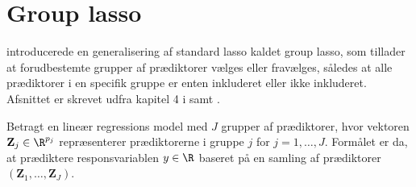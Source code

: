 \section{Group lasso}
\citep{group_lasso} introducerede en generalisering af standard lasso kaldet group lasso, som tillader at forudbestemte grupper af prædiktorer vælges eller fravælges, således at alle prædiktorer i en specifik gruppe er enten inkluderet eller ikke inkluderet.
Afsnittet er skrevet udfra kapitel 4 i \citep{hastie} samt \citep{group_lasso}.

Betragt en lineær regressions model med $J$ grupper af prædiktorer, hvor vektoren $\mathbf{Z}_j \in \R^{p_j}$ repræsenterer prædiktorerne i gruppe $j$ for $j=1, \ldots, J$.
Formålet er da, at prædiktere responsvariablen $y \in \R$ baseret på en samling af prædiktorer $(\mathbf{Z}_1,\ldots, \mathbf{Z}_J)$.

